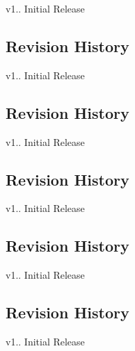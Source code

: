 \begin{DoxyItemize}
\item v1.. Initial Release
\end{DoxyItemize}\hypertarget{group___h_p_l_hpl_port_rev}{}\subsection{Revision History}\label{group___h_p_l_hpl_port_rev}

\begin{DoxyItemize}
\item v1.. Initial Release
\end{DoxyItemize}\hypertarget{group___h_p_l_hpl_init_rev}{}\subsection{Revision History}\label{group___h_p_l_hpl_init_rev}

\begin{DoxyItemize}
\item v1.. Initial Release
\end{DoxyItemize}\hypertarget{group___h_p_l_hpl_irq_rev}{}\subsection{Revision History}\label{group___h_p_l_hpl_irq_rev}

\begin{DoxyItemize}
\item v1.. Initial Release
\end{DoxyItemize}\hypertarget{group___h_p_l_hpl_usart_sync_rev}{}\subsection{Revision History}\label{group___h_p_l_hpl_usart_sync_rev}

\begin{DoxyItemize}
\item v1.. Initial Release
\end{DoxyItemize}\hypertarget{group___h_p_l_hpl_usart_rev}{}\subsection{Revision History}\label{group___h_p_l_hpl_usart_rev}

\begin{DoxyItemize}
\item v1.. Initial Release 
\end{DoxyItemize}

